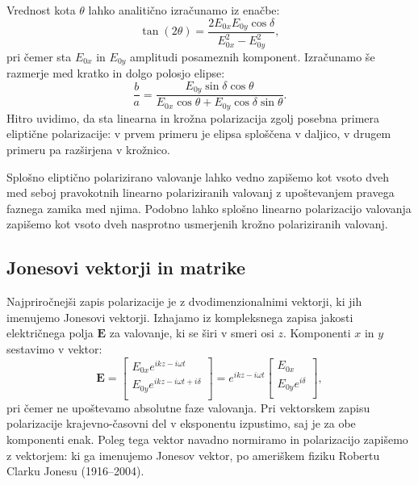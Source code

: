 Vrednost 
kota $\theta$ lahko analitično izračunamo iz enačbe:
\begin{equation}
\tan (2\theta) = \frac{2E_{0x}E_{0y}\cos \delta}{E_{0x}^2 - E_{0y}^2},
\label{eq:elipsatheta}
\end{equation}
pri čemer sta $E_{0x}$ in $E_{0y}$ amplitudi posameznih komponent.
Izračunamo še
razmerje med kratko in dolgo polosjo elipse:
\begin{equation}
\frac{b}{a} = \frac{E_{0y}\sin\delta\cos \theta}{E_{0x}\cos \theta + E_{0y}\cos\delta\sin\theta}.
\label{eq:elipsaba}
\end{equation}
Hitro uvidimo, da sta linearna in krožna polarizacija zgolj posebna
primera eliptične polarizacije: v prvem primeru je elipsa sploščena v daljico, 
v drugem primeru pa razširjena v krožnico. 

Splošno eliptično polarizirano valovanje lahko vedno
zapišemo kot vsoto dveh med seboj pravokotnih
linearno polariziranih valovanj z upoštevanjem pravega faznega zamika med njima.
Podobno lahko splošno linearno polarizacijo valovanja zapišemo kot vsoto 
dveh nasprotno usmerjenih krožno polariziranih valovanj.

\subsection*{Jonesovi vektorji in matrike}
Najpriročnejši zapis polarizacije je z dvodimenzionalnimi 
vektorji, ki jih imenujemo Jonesovi vektorji.  Izhajamo iz kompleksnega zapisa
jakosti električnega polja $\mathbf{E}$ za valovanje, ki se širi v smeri osi $z$.
Komponenti $x$ in $y$ sestavimo v vektor:
\begin{equation}
\mathbf{E} = 
\left[\begin{array}{c}
E_{0x} e^{ikz - i\omega t}\\
E_{0y} e^{ikz - i\omega t + i \delta}\\
\end{array}\right]
= e^{ikz - i\omega t} 
\left[\begin{array}{c}
E_{0x}\\
E_{0y} e^{i \delta}\\
\end{array}\right]\!\!,
\label{eq:03_41}
\end{equation}
pri čemer ne upoštevamo absolutne faze valovanja. 
Pri vektorskem zapisu polarizacije krajevno-časovni del v eksponentu izpustimo, saj 
je za obe komponenti enak. Poleg tega vektor navadno normiramo in 
polarizacijo zapišemo z vektorjem:
ki ga imenujemo Jonesov vektor, po ameriškem fiziku Robertu Clarku Jonesu (1916--2004).

